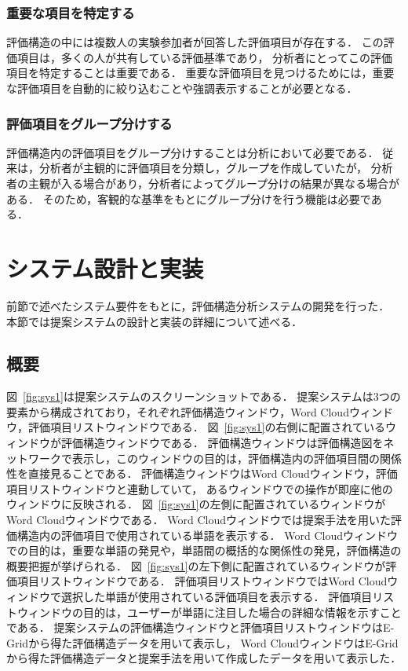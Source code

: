 \documentclass[syuuron]{kuee}
\begin{document}
		\subsubsection{重要な項目を特定する}
			評価構造の中には複数人の実験参加者が回答した評価項目が存在する．
			この評価項目は，多くの人が共有している評価基準であり，
			分析者にとってこの評価項目を特定することは重要である．
			重要な評価項目を見つけるためには，重要な評価項目を自動的に絞り込むことや強調表示することが必要となる．
		\subsubsection{評価項目をグループ分けする}%
			評価構造内の評価項目をグループ分けすることは分析において必要である．
			従来は，分析者が主観的に評価項目を分類し，グループを作成していたが，
			分析者の主観が入る場合があり，分析者によってグループ分けの結果が異なる場合がある．
			そのため，客観的な基準をもとにグループ分けを行う機能は必要である．
	\section{システム設計と実装}
		前節で述べたシステム要件をもとに，評価構造分析システムの開発を行った．
		本節では提案システムの設計と実装の詳細について述べる．
		\subsection{概要}
			図~\ref{fig:sys1}は提案システムのスクリーンショットである．
			提案システムは3つの要素から構成されており，それぞれ評価構造ウィンドウ，Word Cloudウィンドウ，評価項目リストウィンドウである．
			図~\ref{fig:sys1}の右側に配置されているウィンドウが評価構造ウィンドウである．
			評価構造ウィンドウは評価構造図をネットワークで表示し，このウィンドウの目的は，評価構造内の評価項目間の関係性を直接見ることである．
			評価構造ウィンドウはWord Cloudウィンドウ，評価項目リストウィンドウと連動していて，
			あるウィンドウでの操作が即座に他のウィンドウに反映される．
			図~\ref{fig:sys1}の左側に配置されているウィンドウがWord Cloudウィンドウである．
			Word Cloudウィンドウでは提案手法を用いた評価構造内の評価項目で使用されている単語を表示する．
			Word Cloudウィンドウでの目的は，重要な単語の発見や，単語間の概括的な関係性の発見，評価構造の概要把握が挙げられる．
			図~\ref{fig:sys1}の左下側に配置されているウィンドウが評価項目リストウィンドウである．
			評価項目リストウィンドウではWord Cloudウィンドウで選択した単語が使用されている評価項目を表示する．
			評価項目リストウィンドウの目的は，ユーザーが単語に注目した場合の詳細な情報を示すことである．
			提案システムの評価構造ウィンドウと評価項目リストウィンドウはE-Gridから得た評価構造データを用いて表示し，
			Word CloudウィンドウはE-Gridから得た評価構造データと提案手法を用いて作成したデータを用いて表示した．
			
\end{document}
